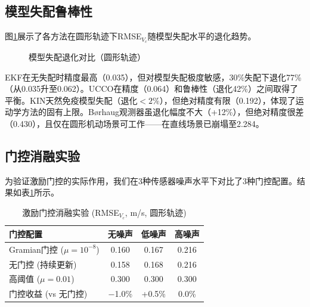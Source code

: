 \subsection{模型失配鲁棒性}

图\ref{fig:degradation}展示了各方法在圆形轨迹下RMSE$_{V_c}$随模型失配水平的退化趋势。

\begin{figure}[h]
\centering
{}
\caption{模型失配退化对比（圆形轨迹）}
\label{fig:degradation}
\end{figure}

EKF在无失配时精度最高（0.035），但对模型失配极度敏感，30\%失配下退化77\%（从0.035升至0.062）。UCCO在精度（0.064）和鲁棒性（退化42\%）之间取得了平衡。KIN天然免疫模型失配（退化$<2\%$），但绝对精度有限（0.192），体现了运动学方法的固有上限。B{\o}rhaug观测器虽退化幅度不大（+12\%），但绝对精度很差（0.430），且仅在圆形机动场景可工作——在直线场景已崩塌至2.284。

\subsection{门控消融实验}

为验证激励门控的实际作用，我们在3种传感器噪声水平下对比了3种门控配置。结果如表\ref{tab:gate}所示。

\begin{table}[h]
\centering
\caption{激励门控消融实验 (RMSE$_{V_c}$, m/s, 圆形轨迹)}
\label{tab:gate}
\begin{tabular}{lccc}
\toprule
门控配置 & 无噪声 & 低噪声 & 高噪声 \\
\midrule
Gramian门控 ($\mu=10^{-8}$) & 0.160 & 0.167 & 0.216 \\
无门控 (持续更新)           & 0.158 & 0.168 & 0.216 \\
高阈值 ($\mu=0.01$)          & 0.300 & 0.300 & 0.300 \\
\midrule
门控收益 (vs 无门控)         & $-$1.0\% & +0.5\% & 0.0\% \\
\bottomrule
\end{tabular}
\end{table}

